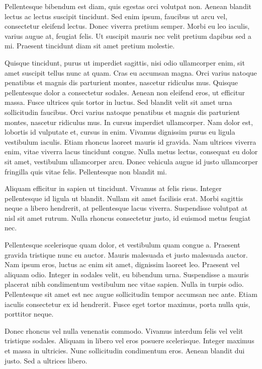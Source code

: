 \documentclass[10pt]{article}
\begin{document}
	Pellentesque bibendum est diam, quis egestas orci volutpat non. Aenean blandit lectus ac lectus suscipit tincidunt. Sed enim ipsum, faucibus ut arcu vel, consectetur eleifend lectus. Donec viverra pretium semper. Morbi eu leo iaculis, varius augue at, feugiat felis. Ut suscipit mauris nec velit pretium dapibus sed a mi. Praesent tincidunt diam sit amet pretium molestie.
	
	Quisque tincidunt, purus ut imperdiet sagittis, nisi odio ullamcorper enim, sit amet suscipit tellus nunc at quam. Cras eu accumsan magna. Orci varius natoque penatibus et magnis dis parturient montes, nascetur ridiculus mus. Quisque pellentesque dolor a consectetur sodales. Aenean non eleifend eros, ut efficitur massa. Fusce ultrices quis tortor in luctus. Sed blandit velit sit amet urna sollicitudin faucibus. Orci varius natoque penatibus et magnis dis parturient montes, nascetur ridiculus mus. In cursus imperdiet ullamcorper. Nam dolor est, lobortis id vulputate et, cursus in enim. Vivamus dignissim purus eu ligula vestibulum iaculis. Etiam rhoncus laoreet mauris id gravida. Nam ultrices viverra enim, vitae viverra lacus tincidunt congue. Nulla metus lectus, consequat eu dolor sit amet, vestibulum ullamcorper arcu. Donec vehicula augue id justo ullamcorper fringilla quis vitae felis. Pellentesque non blandit mi.
	
	Aliquam efficitur in sapien ut tincidunt. Vivamus at felis risus. Integer pellentesque id ligula ut blandit. Nullam sit amet facilisis erat. Morbi sagittis neque a libero hendrerit, at pellentesque lacus viverra. Suspendisse volutpat at nisl sit amet rutrum. Nulla rhoncus consectetur justo, id euismod metus feugiat nec.
	
	Pellentesque scelerisque quam dolor, et vestibulum quam congue a. Praesent gravida tristique nunc eu auctor. Mauris malesuada et justo malesuada auctor. Nam ipsum eros, luctus ac enim sit amet, dignissim laoreet leo. Praesent vel aliquam odio. Integer in sodales velit, eu bibendum urna. Suspendisse a mauris placerat nibh condimentum vestibulum nec vitae sapien. Nulla in turpis odio. Pellentesque sit amet est nec augue sollicitudin tempor accumsan nec ante. Etiam iaculis consectetur ex id hendrerit. Fusce eget tortor maximus, porta nulla quis, porttitor neque.
	
	Donec rhoncus vel nulla venenatis commodo. Vivamus interdum felis vel velit tristique sodales. Aliquam in libero vel eros posuere scelerisque. Integer maximus et massa in ultricies. Nunc sollicitudin condimentum eros. Aenean blandit dui justo. Sed a ultrices libero.
	
\end{document}

